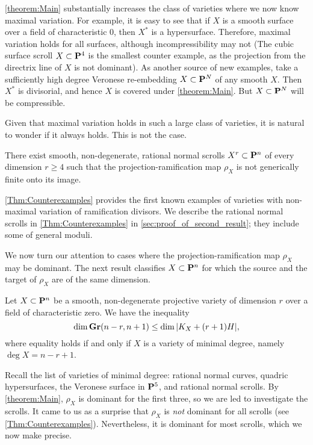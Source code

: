\documentclass[11pt,reqno]{amsart}
\theoremstyle{plain}
\theoremstyle{definition}
\theoremstyle{remark}
\numberwithin{equation}{section}
\numberwithin{equation}{section}
\begin{document}
\autoref{theorem:Main} substantially increases the class of varieties where we now know maximal variation.
For example, it is easy to see that if $X$ is a smooth surface over a field of characteristic $0$, then $X^*$ is a hypersurface.
Therefore, maximal variation holds for all surfaces, although incompressibility may not (The cubic surface scroll $X \subset \P^4$ is the smallest counter example, as the projection from the directrix line of $X$ is not dominant).
As another source of new examples, take a sufficiently high degree Veronese re-embedding $X \subset \P^N$ of any smooth $X$.
Then $X^*$ is divisorial, and hence $X$ is covered under \autoref{theorem:Main}.
But $X \subset \P^N$ will be compressible.

Given that maximal variation holds in such a large class of varieties, it is natural to wonder if it always holds.
This is not the case.
\begin{maintheorem}
  \label{Thm:Counterexamples}
  There exist smooth, non-degenerate, rational normal scrolls $X^{r} \subset \P^{n}$ of every dimension $r \geq 4$ such that the projection-ramification map $\rho_{X}$ is not generically finite onto its image.
\end{maintheorem}
\autoref{Thm:Counterexamples} provides the first known examples of varieties with non-maximal variation of ramification divisors.
We describe the rational normal scrolls in \autoref{Thm:Counterexamples} in \autoref{sec:proof_of_second_result}; they include some of general moduli.

We now turn our attention to cases where the projection-ramification map $\rho_X$ may be dominant.
The next result classifies $X \subset \P^n$ for which the source and the target of $\rho_X$ are of the same dimension.
\begin{maintheorem}\label{theorem:minimaldegree}
  Let $X \subset \P^{n}$ be a smooth, non-degenerate projective variety of dimension $r$ over a field of characteristic zero.
  We have the inequality
  \[ \dim \Gr(n-r, n+1) \leq \dim |K_X + (r+1)H|,\]
  where equality holds if and only if $X$ is a variety of minimal degree, namely $\deg X = n-r+1$.
\end{maintheorem}
Recall the list of varieties of minimal degree: rational normal curves, quadric hypersurfaces, the Veronese surface in $\P^5$, and rational normal scrolls.
By \autoref{theorem:Main}, $\rho_X$ is dominant for the first three, so we are led to investigate the scrolls.
It came to us as a surprise that $\rho_X$ is \emph{not} dominant for all scrolls (see \autoref{Thm:Counterexamples}).
Nevertheless, it is dominant for most scrolls, which we now make precise.
\end{document}
